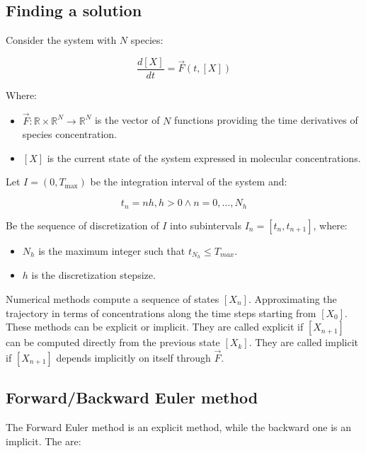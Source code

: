   \subsection{Finding a solution}
  Consider the system with $N$ species:

  $$\frac{d[X]}{dt} = \vec{F}(t,[X])$$

  Where:

  \begin{multicols}{2}
    \begin{itemize}
      \item $\vec{F}:\mathbb{R}\times\mathbb{R}^N\rightarrow\mathbb{R}^N$ is the vector of $N$ functions providing the time derivatives of species concentration.
      \item $[X]$ is the current state of the system expressed in molecular concentrations.
    \end{itemize}
  \end{multicols}

  Let $I = (0,T_{\max})$ be the integration interval of the system and:

  $$t_n = nh, h>0\land n = 0, \dots, N_h$$

  Be the sequence of discretization of $I$ into subintervals $I_n = [t_n, t_{n+1}]$, where:

  \begin{multicols}{2}
    \begin{itemize}
      \item $N_h$ is the maximum integer such that $t_{N_h}\le T_{max}$.
      \item $h$ is the discretization stepsize.
    \end{itemize}
  \end{multicols}

  Numerical methods compute a sequence of states $[X_n]$.
  Approximating the trajectory in terms of concentrations along the time steps starting from $[X_0]$.
  These methods can be explicit or implicit.
  They are called explicit if $[X_{n+1}]$ can be computed directly from the previous state $[X_k]$.
  They are called implicit if $[X_{n+1}]$ depends implicitly on itself through $\vec{F}$.

  \subsection{Forward/Backward Euler method}
  The Forward Euler method is an explicit method, while the backward one is an implicit.
  The are:

